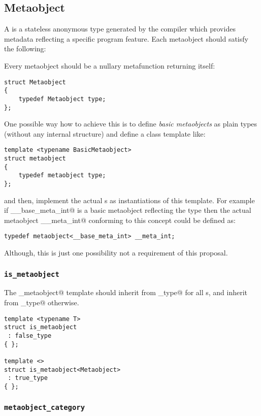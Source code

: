 \subsection{Metaobject}
\label{concept-Metaobject}

A  is a stateless anonymous type generated by the compiler which
provides metadata reflecting a specific program feature. Each metaobject
should satisfy the following:

Every metaobject should be a nullary metafunction returning itself:

\begin{verbatim}
struct Metaobject
{
	typedef Metaobject type;
};
\end{verbatim}

One possible way how to achieve this is to define {\em basic metaobjects}
as plain types (without any internal structure) and define a class template like:

\begin{verbatim}
template <typename BasicMetaobject>
struct metaobject
{
	typedef metaobject type;
};
\end{verbatim}

and then, implement the actual s as instantiations of this template.
For example if \verb@__base_meta_int@ is a basic metaobject reflecting the \verb@int@
type then the actual metaobject \verb@__meta_int@ conforming to this concept could 
be defined as:

\begin{verbatim}
typedef metaobject<__base_meta_int> __meta_int;
\end{verbatim}

Although, this is just one possibility not a requirement of this proposal.

\subsubsection{\texttt{is\_metaobject}}

The \verb@is_metaobject@ template should inherit from \verb@true_type@ for all s,
and inherit from \verb@false_type@ otherwise.

\begin{verbatim}
template <typename T>
struct is_metaobject
 : false_type
{ };

template <>
struct is_metaobject<Metaobject>
 : true_type
{ };
\end{verbatim}

\subsubsection{\texttt{metaobject\_category}}

